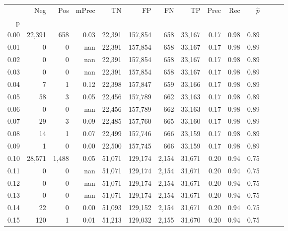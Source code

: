 \begin{tabular}{rrrrrrrrrrrrrr}
\toprule
{} &     Neg &    Pos & mPrec &       TN &       FP &      FN &      TP &  Prec &   Rec & $\hat{p}$ \\
p    &         &        &       &          &          &         &         &       &       &           \\
\midrule
0.00 &  22,391 &    658 &  0.03 &   22,391 &  157,854 &     658 &  33,167 &  0.17 &  0.98 &      0.89 \\
0.01 &       0 &      0 &   nan &   22,391 &  157,854 &     658 &  33,167 &  0.17 &  0.98 &      0.89 \\
0.02 &       0 &      0 &   nan &   22,391 &  157,854 &     658 &  33,167 &  0.17 &  0.98 &      0.89 \\
0.03 &       0 &      0 &   nan &   22,391 &  157,854 &     658 &  33,167 &  0.17 &  0.98 &      0.89 \\
0.04 &       7 &      1 &  0.12 &   22,398 &  157,847 &     659 &  33,166 &  0.17 &  0.98 &      0.89 \\
0.05 &      58 &      3 &  0.05 &   22,456 &  157,789 &     662 &  33,163 &  0.17 &  0.98 &      0.89 \\
0.06 &       0 &      0 &   nan &   22,456 &  157,789 &     662 &  33,163 &  0.17 &  0.98 &      0.89 \\
0.07 &      29 &      3 &  0.09 &   22,485 &  157,760 &     665 &  33,160 &  0.17 &  0.98 &      0.89 \\
0.08 &      14 &      1 &  0.07 &   22,499 &  157,746 &     666 &  33,159 &  0.17 &  0.98 &      0.89 \\
0.09 &       1 &      0 &  0.00 &   22,500 &  157,745 &     666 &  33,159 &  0.17 &  0.98 &      0.89 \\
0.10 &  28,571 &  1,488 &  0.05 &   51,071 &  129,174 &   2,154 &  31,671 &  0.20 &  0.94 &      0.75 \\
0.11 &       0 &      0 &   nan &   51,071 &  129,174 &   2,154 &  31,671 &  0.20 &  0.94 &      0.75 \\
0.12 &       0 &      0 &   nan &   51,071 &  129,174 &   2,154 &  31,671 &  0.20 &  0.94 &      0.75 \\
0.13 &       0 &      0 &   nan &   51,071 &  129,174 &   2,154 &  31,671 &  0.20 &  0.94 &      0.75 \\
0.14 &      22 &      0 &  0.00 &   51,093 &  129,152 &   2,154 &  31,671 &  0.20 &  0.94 &      0.75 \\
0.15 &     120 &      1 &  0.01 &   51,213 &  129,032 &   2,155 &  31,670 &  0.20 &  0.94 &      0.75 \\

\end{tabular}
